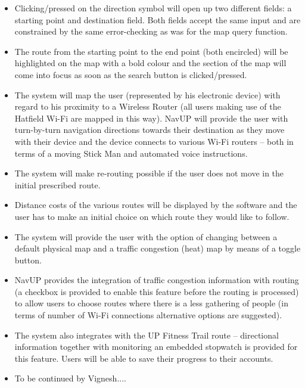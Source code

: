 \documentclass[runningheads,a4paper]{llncs}
\begin{document}
\begin{itemize}

\item Clicking/pressed on the direction symbol will open up two different fields: a starting point and destination field. Both fields accept the same input and are constrained by the same error-checking as was for the map query function.

\item The route from the starting point to the end point (both encircled) will be highlighted on the map with a bold colour and the section of the map will come into focus as soon as the search button is clicked/pressed.

\item The system will map the user (represented by his electronic device) with regard to his proximity to a Wireless Router (all users making use of the Hatfield Wi-Fi are mapped in this way). NavUP will provide the user with turn-by-turn navigation directions towards their destination as they move with their device and the device connects to various Wi-Fi routers – both in terms of a moving Stick Man and automated voice instructions.

\item The system will make re-routing possible if the user does not move in the initial prescribed route.

\item Distance costs of the various routes will be displayed by the software and the user has to make an initial choice on which route they would like to follow.

\item The system will provide the user with the option of changing between a default physical map and a traffic congestion (heat) map by means of a toggle button.

\item NavUP provides the integration of traffic congestion information with routing (a checkbox is provided to enable this feature before the routing is processed) to allow users to choose routes where there is a less gathering of people (in terms of number of Wi-Fi connections alternative options are suggested).

\item The system also integrates with the UP Fitness Trail route – directional information together with monitoring an embedded stopwatch is provided for this feature. Users will be able to save their progress to their accounts.

\item To be continued by Vignesh....

\end{itemize}
\end{document}

